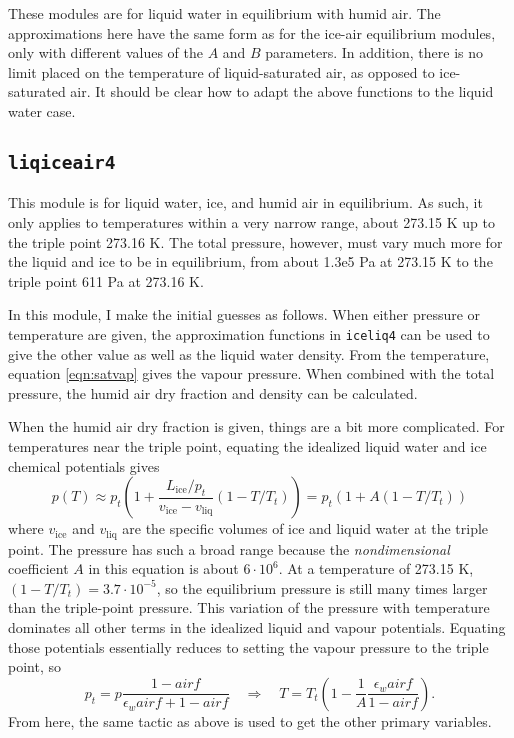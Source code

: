 \documentclass{article}
\newcommand{\liq}{\text{liq}}
\newcommand{\ice}{\text{ice}}
\newcommand{\epsw}{\epsilon_w}
\begin{document}
These modules are for liquid water in equilibrium with humid air. The approximations here have the same form as for the ice-air equilibrium modules, only with different values of the $A$ and $B$ parameters. In addition, there is no limit placed on the temperature of liquid-saturated air, as opposed to ice-saturated air. It should be clear how to adapt the above functions to the liquid water case.


\subsection{\texttt{liqiceair4}}

This module is for liquid water, ice, and humid air in equilibrium. As such, it only applies to temperatures within a very narrow range, about 273.15 K up to the triple point 273.16 K. The total pressure, however, must vary much more for the liquid and ice to be in equilibrium, from about 1.3e5 Pa at 273.15 K to the triple point 611 Pa at 273.16 K.

In this module, I make the initial guesses as follows. When either pressure or temperature are given, the approximation functions in \texttt{iceliq4} can be used to give the other value as well as the liquid water density. From the temperature, equation \ref{eqn:satvap} gives the vapour pressure. When combined with the total pressure, the humid air dry fraction and density can be calculated.

When the humid air dry fraction is given, things are a bit more complicated. For temperatures near the triple point, equating the idealized liquid water and ice chemical potentials gives
\begin{equation*}
    p(T) \approx p_t \left( 1 + \frac{L_{\ice}/p_t}{v_{\ice} - v_{\liq}} (1 - T/T_t) \right) = p_t (1 + A (1 - T/T_t))
\end{equation*}
where $v_{\ice}$ and $v_{\liq}$ are the specific volumes of ice and liquid water at the triple point. The pressure has such a broad range because the \textit{nondimensional} coefficient $A$ in this equation is about $6\cdot10^6$. At a temperature of 273.15 K, $(1-T/T_t) = 3.7\cdot 10^{-5}$, so the equilibrium pressure is still many times larger than the triple-point pressure. This variation of the pressure with temperature dominates all other terms in the idealized liquid and vapour potentials. Equating those potentials essentially reduces to setting the vapour pressure to the triple point, so
\begin{equation*}
    p_t = p \frac{1-airf}{\epsw airf + 1-airf} \quad \Rightarrow \quad T = T_t \left( 1 - \frac{1}{A} \frac{\epsw airf}{1-airf} \right).
\end{equation*}
From here, the same tactic as above is used to get the other primary variables.
\end{document}
